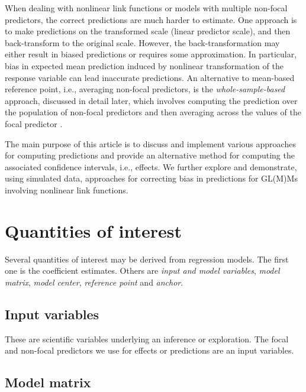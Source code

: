 When dealing with nonlinear link functions or models with multiple non-focal predictors, the correct predictions are much harder to estimate. One approach is to make predictions on the transformed scale (linear predictor scale), and then back-transform to the original scale. However, the back-transformation may either result in biased predictions or requires some approximation. In particular, bias in expected mean prediction induced by nonlinear transformation of the response variable can lead inaccurate predictions. An alternative to mean-based reference point, i.e., averaging non-focal predictors, is the \emph{whole-sample-based} approach, discussed in detail later, which involves computing the prediction over the population of non-focal predictors and then averaging across the values of the focal predictor \citep{hanmer2013behind}. 

The main purpose of this article is to discuss and implement various approaches for computing predictions and provide an alternative method for computing the associated confidence intervals, i.e., effects. We further explore and demonstrate, using simulated data, approaches for correcting bias in predictions for GL(M)Ms involving nonlinear link functions.

\section{Quantities of interest}


Several quantities of interest may be derived from regression models. The first one is the coefficient estimates. Others are \emph{input and model variables}, \emph{model matrix}, \emph{model center}, \emph{reference point} and \emph{anchor}.

\subsection{Input variables}

These are scientific variables underlying an inference or exploration. The focal and non-focal predictors we use for effects or predictions are an input variables.

\subsection{Model matrix}

